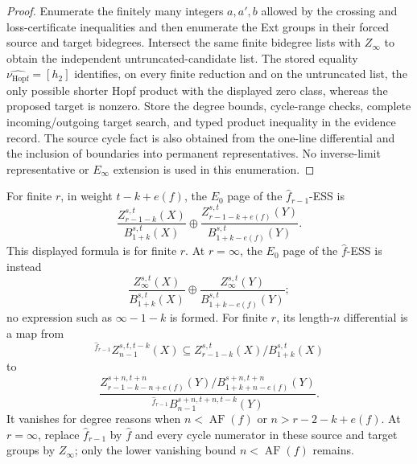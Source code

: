 \begin{proof}
  Enumerate the finitely many integers $a,a',b$ allowed by the crossing and
  loss-certificate inequalities and then enumerate the Ext groups in their
  forced source and target bidegrees.  Intersect the same finite bidegree lists
  with $Z_\infty$ to obtain the independent untruncated-candidate list.  The
  stored equality $\widehat{\nu_{\mathrm{Hopf}}}=[h_2]$ identifies, on every
  finite reduction and on the untruncated list, the only possible shorter Hopf
  product with the displayed zero class, whereas the proposed target is
  nonzero.  Store
  the degree bounds, cycle-range checks, complete incoming/outgoing target
  search, and typed product inequality in the evidence record.  The source cycle fact is
  also obtained from the one-line differential and the inclusion of boundaries
  into permanent representatives.  No inverse-limit representative or
  $E_\infty$ extension is used in this enumeration.
\end{proof}

\begin{proposition}
  \label{prop:hat-map-ess-e0}
  \notready
  For finite $r$, in weight $t-k+e(f)$, the $E_0$ page of the
  $\widehat f_{r-1}$-ESS is
  \[
  \frac{Z_{r-1-k}^{s,t}(X)}{B_{1+k}^{s,t}(X)}\oplus
  \frac{Z_{r-1-k+e(f)}^{s,t}(Y)}{B_{1+k-e(f)}^{s,t}(Y)}.
  \]
  This displayed formula is for finite $r$.  At $r=\infty$, the $E_0$ page
  of the $\widehat f$-ESS is instead
  \[
  \frac{Z_\infty^{s,t}(X)}{B_{1+k}^{s,t}(X)}\oplus
  \frac{Z_\infty^{s,t}(Y)}{B_{1+k-e(f)}^{s,t}(Y)};
  \]
  no expression such as $\infty-1-k$ is formed.
  For finite $r$, its length-$n$ differential is a map from
  \[
    {}^{\widehat f_{r-1}}\!Z_{n-1}^{s,t,t-k}(X)
      \subseteq Z_{r-1-k}^{s,t}(X)/B_{1+k}^{s,t}(X)
  \]
  to
  \[
    \frac{Z_{r-1-k-n+e(f)}^{s+n,t+n}(Y)/
      B_{1+k+n-e(f)}^{s+n,t+n}(Y)}
    {{}^{\widehat f_{r-1}}\!B_{n-1}^{s+n,t+n,t-k}(Y)}.
  \]
  It vanishes for degree reasons when $n<\operatorname{AF}(f)$ or
  $n>r-2-k+e(f)$.
  At $r=\infty$, replace $\widehat f_{r-1}$ by $\widehat f$ and every cycle
  numerator in these source and target groups by $Z_\infty$; only the lower
  vanishing bound $n<\operatorname{AF}(f)$ remains.
\end{proposition}

